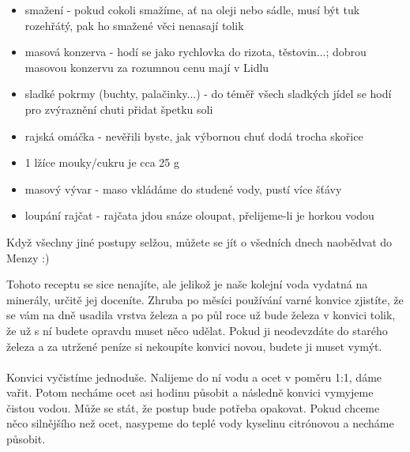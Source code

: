 \begin{itemize}
\item smažení - pokud cokoli smažíme, ať na oleji nebo sádle, musí být tuk
rozehřátý, pak ho smažené věci nenasají tolik
\item masová konzerva - hodí se jako rychlovka do rizota, těstovin...; dobrou
masovou konzervu za rozumnou cenu mají v Lidlu
\item sladké pokrmy (buchty, palačinky...) - do téměř všech sladkých jídel se
hodí pro zvýraznění chuti přidat špetku soli
\item rajská omáčka - nevěřili byste, jak výbornou chuť dodá trocha skořice
\item 1 lžíce mouky/cukru je cca 25 g
\item masový vývar - maso vkládáme do studené vody, pustí více šťávy
\item loupání rajčat - rajčata jdou snáze oloupat, přelijeme-li je horkou vodou
\end{itemize}

Když všechny jiné postupy selžou, můžete se jít o všedních dnech naobědvat do
Menzy :)

Tohoto receptu se sice nenajíte, ale jelikož je naše kolejní voda vydatná na
minerály, určitě jej doceníte. Zhruba po měsíci používání varné konvice
zjistíte, že se vám na dně usadila vrstva železa a po půl roce už bude železa v
konvici tolik, že už s ní budete opravdu muset něco udělat. Pokud ji neodevzdáte
do starého železa a za utržené peníze si nekoupíte konvici novou, budete ji
muset vymýt.
\\\\
Konvici vyčistíme jednoduše. Nalijeme do ní vodu a ocet v poměru 1:1, dáme
vařit. Potom necháme ocet asi hodinu působit a následně konvici vymyjeme čistou
vodou. Může se stát, že postup bude potřeba opakovat. Pokud chceme něco
silnějšího než ocet, nasypeme do teplé vody kyselinu citrónovou a necháme
působit.